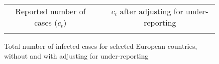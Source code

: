 \documentclass[12pt]{article}
\begin{document}
\begin{figure}[tb]%
\caption
{Total number of infected cases for selected European countries, without and with adjusting for under-reporting}%
\vspace{-0.2cm}%
\label{fig: Euro_ct}%

\begin{footnotesize}%


\begin{center}%
\begin{tabular}
[c]{ccc}%
Reported number of cases ($c_{t}$) &  & $c_{t}$ after adjusting for
under-reporting\\%
{\includegraphics[
height=1.9951in,
width=2.6524in
]%
{figs/cmp_ER_N50000_guess5_2W_cT.png}%
}
&  &
{\includegraphics[
height=1.9951in,
width=2.6524in
]%
{figs/cmp_ER_N50000_guess5_2W_cT_MF.png}%
}
\end{tabular}

\end{center}


\end{footnotesize}
\end{figure}
\end{document}
